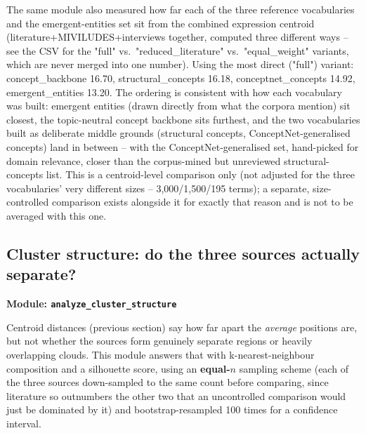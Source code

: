 \documentclass[11pt,a4paper]{article}
\newcommand{\jargon}[1]{\textbf{#1}}
\begin{document}
The same module also measured how far each of the three reference
vocabularies and the emergent-entities set sit from the combined
expression centroid (literature+MIVILUDES+interviews together, computed
three different ways -- see the CSV for the "full" vs.\
"reduced\_literature" vs.\ "equal\_weight" variants, which are never
merged into one number). Using the most direct ("full") variant:
concept\_backbone 16.70, structural\_concepts 16.18,
conceptnet\_concepts 14.92, emergent\_entities 13.20. The ordering is
consistent with how each vocabulary was built: emergent entities (drawn
directly from what the corpora mention) sit closest, the topic-neutral
concept backbone sits furthest, and the two vocabularies built as
deliberate middle grounds (structural concepts, ConceptNet-generalised
concepts) land in between -- with the ConceptNet-generalised set,
hand-picked for domain relevance, closer than the corpus-mined but
unreviewed structural-concepts list. This is a centroid-level comparison
only (not adjusted for the three vocabularies' very different sizes --
3,000/1,500/195 terms); a separate, size-controlled comparison exists
alongside it for exactly that reason and is not to be averaged with this
one.

\subsection{Cluster structure: do the three sources actually separate?}
\label{sec:cluster}
\jargon{Module: \texttt{analyze\_cluster\_structure}}

Centroid distances (previous section) say how far apart the
\emph{average} positions are, but not whether the sources form genuinely
separate regions or heavily overlapping clouds. This module answers that
with k-nearest-neighbour composition and a silhouette score, using an
\jargon{equal-$n$} sampling scheme (each of the three sources
down-sampled to the same count before comparing, since literature so
outnumbers the other two that an uncontrolled comparison would just be
dominated by it) and bootstrap-resampled 100 times for a confidence
interval.
\end{document}
